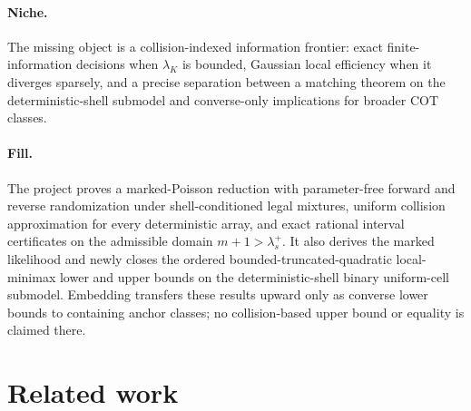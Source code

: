 \documentclass{article}
\begin{document}
\paragraph{Niche.} The missing object is a collision-indexed information frontier: exact finite-information decisions when \(\lambda_K\) is bounded, Gaussian local efficiency when it diverges sparsely, and a precise separation between a matching theorem on the deterministic-shell submodel and converse-only implications for broader COT classes.

\paragraph{Fill.} The project proves a marked-Poisson reduction with parameter-free forward and reverse randomization under shell-conditioned legal mixtures, uniform collision approximation for every deterministic array, and exact rational interval certificates on the admissible domain \(m+1>\lambda_s^+\). It also derives the marked likelihood and newly closes the ordered bounded-truncated-quadratic local-minimax lower and upper bounds on the deterministic-shell binary uniform-cell submodel. Embedding transfers these results upward only as converse lower bounds to containing anchor classes; no collision-based upper bound or equality is claimed there.

\section{Related work}
\end{document}
